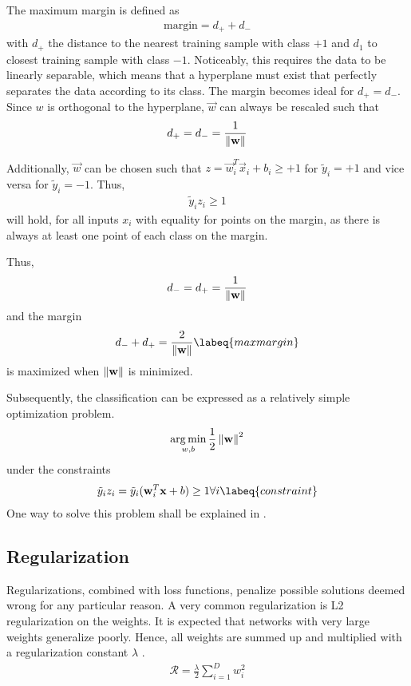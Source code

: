 The maximum margin is defined as
\begin{align}
    \text{margin} = d_+ + d_-
\end{align}
with $d_+$ the distance to the nearest training sample with class $+1$ and $d_1$ to closest training sample with class $-1$.
Noticeably, this requires the data to be linearly separable, which means that a hyperplane must exist that perfectly separates the data according to its class.
The margin becomes ideal for $d_+ = d_-$.
Since $w$ is orthogonal to the hyperplane, $\vec{w}$ can always be rescaled such that 
\begin{align}
    d_+ = d_- = \frac{1}{\left\lVert\mathbf{w}\right\rVert}
\end{align}

Additionally, $\vec{w}$ can be chosen such that $z = \vec{w}_i^T \vec{x}_i + b_i \geq +1$ for $\tilde{y}_i = +1$ and vice versa for $\tilde{y}_i = -1$.
Thus,
\begin{align}
    \tilde{y}_i z_i \geq 1
\end{align}
will hold, for all inputs $x_i$ with equality for points on the margin, as there is always at least one point of each class on the margin.

Thus,
\begin{align}
    d_- = d_+ = \frac{1}{\left\lVert\mathbf{w}\right\rVert}
\end{align}
and the margin
\begin{align}
    d_- + d_+ = \frac{2}{\norm{\vec{w}}}
    \labeq{maxmargin}
\end{align}
is maximized when $\left\lVert\mathbf{w}\right\rVert$ is minimized.

Subsequently, the classification can be expressed as a relatively simple optimization problem.
\begin{align}
    \operatorname*{arg\,min}_{w, b} \frac{1}{2} \left\lVert\mathbf{w}\right\rVert^2
\end{align}
under the constraints
\begin{align}
    \tilde{y}_i z_i = \tilde{y}_i (\vec{w}_i^T \vec{x} + b) \geq 1 \forall i
    \labeq{constraint}
\end{align}
One way to solve this problem shall be explained in .

\subsection{Regularization}
Regularizations, combined with loss functions, penalize possible solutions deemed wrong for any particular reason.
A very common regularization is L2 regularization on the weights.
It is expected that networks with very large weights generalize poorly.
Hence, all weights are summed up and multiplied with a regularization constant $\lambda$ \cite{grosse}.
\begin{align}
	\mathcal{R} = \frac{\lambda}{2} \sum_{i = 1}^D w_i^2
\end{align}

